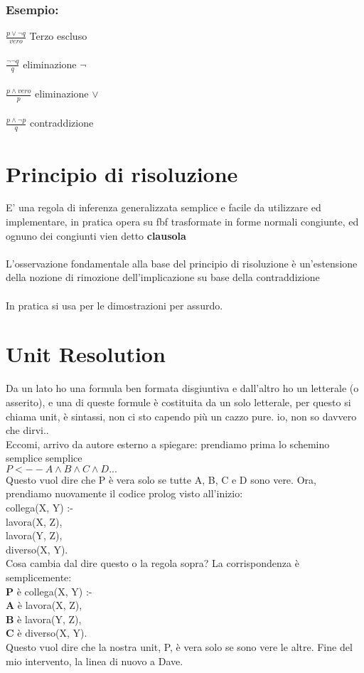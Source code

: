 \documentclass[12pt, a4paper, openany, oneside]{book}
\newcommand\tab[1][1cm]{\hspace*{#1}}
\begin{document}
\subsubsection{Esempio:}
$\frac{p \vee \neg q}{vero} $ Terzo escluso \\ \\
$\frac{\neg \neg q}{q} $ eliminazione $\neg$ \\ \\
$\frac{p \wedge vero}{p} $ eliminazione $\vee$ \\ \\
$\frac{p \wedge \neg p}{q} $ contraddizione
\section{Principio di risoluzione}
E' una regola di inferenza generalizzata semplice e facile da utilizzare ed 
implementare, in pratica opera su fbf trasformate in forme normali congiunte, ed ognuno dei congiunti vien detto \textbf{clausola}
\\ \\
L'osservazione fondamentale alla base del principio di risoluzione è un'estensione della nozione di rimozione dell'implicazione su base della contraddizione \\ \\
In pratica si usa per le dimostrazioni per assurdo.
\section{Unit Resolution}
Da un lato ho una formula ben formata disgiuntiva e dall'altro ho un letterale 
(o asserito), e una di queste formule è costituita da un solo letterale, per 
questo si chiama unit, è sintassi, non ci sto capendo più un cazzo pure. 
io, non so davvero che dirvi.. \\
Eccomi, arrivo da autore esterno a spiegare: prendiamo prima lo schemino semplice
semplice \\
$ P <-- A \wedge B \wedge C \wedge D ...$ \\
Questo vuol dire che P è vera solo se tutte A, B, C e D sono vere. Ora, prendiamo 
nuovamente il codice prolog visto all'inizio: \\
\color{red}
collega(X, Y) :-  \\	
\tab lavora(X, Z), \\	
\tab lavora(Y, Z), \\	
\tab diverso(X, Y). \color{black}\\
Cosa cambia dal dire questo o la regola sopra? La corrispondenza è semplicemente: \\
\color{red}
\textbf{P} è collega(X, Y) :-  \\	
\tab \textbf{A} è lavora(X, Z), \\	
\tab \textbf{B} è lavora(Y, Z), \\	
\tab \textbf{C} è diverso(X, Y). \color{black}\\
Questo vuol dire che la nostra unit, P, è vera solo se sono vere le altre. Fine 
del mio intervento, la linea di nuovo a Dave.
\end{document}
